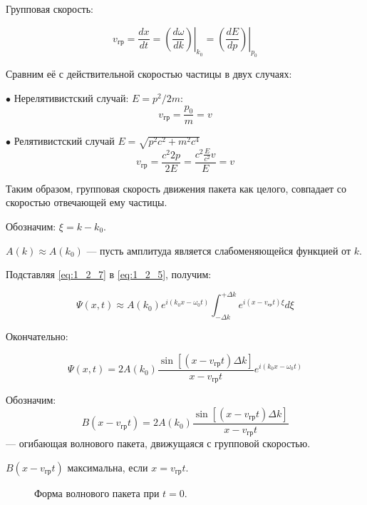 Групповая скорость:

\begin{equation}
\label{eq:1_2_7}
v_{\text{гр}} = \frac{dx}{dt} = \left . \left ( \frac{d\omega}{dk} \right ) \right |_{k_0} = \left . \left ( \frac{dE}{dp} \right ) \right |_{p_0}
\end{equation}

Сравним её с действительной скоростью частицы в двух случаях:

$\bullet$ Нерелятивистский случай: $E = p^2/{2m}$:
$$v_{\text{гр}} = \frac{p_0}{m} = v$$

$\bullet$ Релятивистский случай $E = \sqrt{p^2c^2 + m^2c^4}$
$$v_{\text{гр}} = \frac{c^2 2p}{2E} = \frac{c^2 \frac{E}{c^2}v}{E} = v$$

Таким образом, групповая скорость движения пакета как целого, совпадает со скоростью отвечающей ему частицы. 

Обозначим: $\xi = k - k_0$.

$A(k) \approx A(k_0)$ --- пусть амплитуда является слабоменяющейся функцией от $k$.

Подставляя \eqref{eq:1_2_7} в \eqref{eq:1_2_5}, получим:

$$\Psi(x,t) \approx A(k_0) e^{i(k_0 x - \omega_0 t) }\int^{+ \Delta k}_{ - \Delta k} e^{i(x - v_{\text{гр}}t)\xi} d\xi$$

Окончательно:

\begin{equation}
\label{eq:1_2_8}
\Psi(x,t) = 2 A(k_0) \frac{\sin [(x - v_{\text{гр}}t)\Delta k]}{x - v_{\text{гр}}t}e^{i(k_0 x - \omega_0 t)}
\end{equation}

Обозначим:
$$B(x - v_{\text{гр}}t) =  2 A(k_0) \frac{\sin [(x - v_{\text{гр}}t)\Delta k]}{x - v_{\text{гр}}t}$$ --- огибающая волнового пакета, движущаяся с групповой скоростью.

$B(x - v_{\text{гр}}t)$ максимальна, если $x = v_{\text{гр}}t$.

\begin{figure}[h]
\centering
{}
\caption{Форма волнового пакета при $t=0$.} \label{fig:1_1}
\end{figure}

